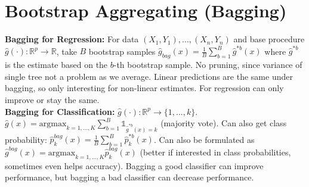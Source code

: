 \section{Bootstrap Aggregating (Bagging)}
\textbf{Bagging for Regression:} For data $(X_1,Y_1),...,(X_n,Y_n)$ and base procedure $\hat g(\cdot): \mathbb{R}^p\to \mathbb{R}$, take $B$ bootstrap samples $\hat g_{bag}(x) = \frac 1 B \sum_{b=1}^B \hat g^{*b}(x)$ where $\hat g^{*b}$ is the estimate based on the $b$-th bootstrap sample. No pruning, since variance of single tree not a problem as we average. Linear predictions are the same under bagging, so only interesting for non-linear estimates. For regression can only improve or stay the same. \\
\textbf{Bagging for Classification:} $\hat g(\cdot): \mathbb{R}^p \to \{1, ..., k\}$. $\hat g (x) = \text{argmax}_{k=1,...,K} \sum_{b=1}^B \mathds{1}_{\hat g^{*b}(x)=k}$ (majority vote). Can also get class probability: $\hat p_k^{bag}(x) = \frac{1}{B} \sum_{b=1}^B \hat p_k^{*b}(x)$. Can also be formulated as $\hat g^{bag}(x) = \text{argmax}_{k=1,...,K} \hat p_k^{bag}(x)$ (better if interested in class probabilities, sometimes even helps accuracy). Bagging a good classifier can improve performance, but bagging a bad classifier can decrease performance. \\

